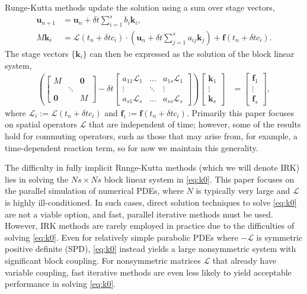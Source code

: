 \documentclass[review]{siamart}
\begin{document}
Runge-Kutta methods update the solution using a sum over stage vectors,
%
\begin{align}\label{eq:update}
\mathbf{u}_{n+1} & = \mathbf{u}_n + \delta t \sum_{i=1}^s b_i\mathbf{k}_i, \\
M\mathbf{k}_i & = \mathcal{L}(t_n+\delta tc_i)\cdot
	\left(\mathbf{u}_n + \delta t\sum_{j=1}^s a_{ij}\mathbf{k}_j\right) +
	\mathbf{f}(t_n+\delta tc_i).\label{eq:stages}
\end{align}
%
The stage vectors $\{\mathbf{k}_i\}$ can then be expressed as the solution of the block linear
system,
%
\begin{align}\label{eq:k0}
\left( \begin{bmatrix} M  & & \mathbf{0} \\ & \ddots \\ \mathbf{0} & & M\end{bmatrix}
	- \delta t \begin{bmatrix} a_{11}\mathcal{L}_1 & ... & a_{1s}\mathcal{L}_1 \\
	\vdots & \ddots & \vdots \\ a_{s1}\mathcal{L}_s & ... & a_{ss} \mathcal{L}_s \end{bmatrix} \right)
	\begin{bmatrix} \mathbf{k}_1 \\ \vdots \\ \mathbf{k}_s \end{bmatrix}
& = \begin{bmatrix} \mathbf{f}_1 \\ \vdots \\ \mathbf{f}_s \end{bmatrix},
\end{align}
%
where $\mathcal{L}_i := \mathcal{L}(t_n+\delta tc_i)$ and $\mathbf{f}_i :=
\mathbf{f}(t_n+\delta tc_i)$. Primarily this paper
focuses on spatial operators $\mathcal{L}$ that are independent of time; however, some of
the results hold for commuting operators, such as those that may arise from, for example,
a time-dependent reaction term, so for now we maintain this generality.

The difficulty in fully implicit Runge-Kutta methods (which we will denote IRK) lies in
solving the $Ns\times Ns$ block linear system in \eqref{eq:k0}. This paper focuses on the
parallel simulation of numerical PDEs, where $N$ is typically very large
and $\mathcal{L}$ is highly ill-conditioned. In such cases, direct
solution techniques to solve \eqref{eq:k0} are not a viable option, and fast, parallel
iterative methods must be used. However, IRK methods are rarely employed in practice due
to the difficulties of solving \eqref{eq:k0}. Even for relatively simple
parabolic PDEs where $-\mathcal{L}$ is symmetric positive definite (SPD), \eqref{eq:k0}
instead yields a large nonsymmetric system with significant block coupling. For
nonsymmetric matrices $\mathcal{L}$ that already have variable coupling, fast iterative
methods are even less likely to yield acceptable performance in solving \eqref{eq:k0}.
\end{document}
